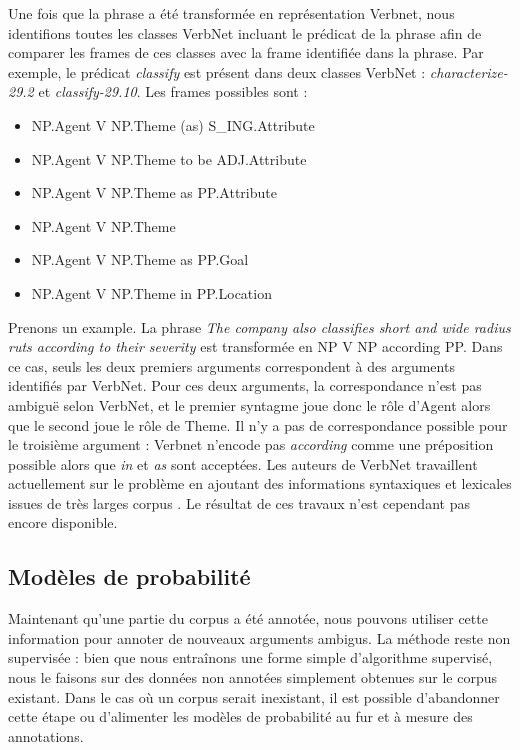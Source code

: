 Une fois que la phrase a été transformée en représentation Verbnet, nous
identifions toutes les classes VerbNet incluant le prédicat de la phrase afin
de comparer les frames de ces classes avec la frame identifiée dans la phrase.
Par exemple, le prédicat \textit{classify} est présent dans deux classes
VerbNet : \textit{characterize-29.2} et \textit{classify-29.10}. Les frames
possibles sont :

\begin{itemize}
    \item NP.Agent V NP.Theme (as) S\_ING.Attribute
    \item NP.Agent V NP.Theme to be ADJ.Attribute
    \item NP.Agent V NP.Theme as PP.Attribute
    \item NP.Agent V NP.Theme
    \item NP.Agent V NP.Theme as PP.Goal
    \item NP.Agent V NP.Theme in PP.Location
\end{itemize}

Prenons un example. La phrase \emph{The company also classifies short and wide
radius ruts according to their severity} est transformée en NP V NP according
PP. Dans ce cas, seuls les deux premiers arguments correspondent à des
arguments identifiés par VerbNet. Pour ces deux arguments, la correspondance
n'est pas ambiguë selon VerbNet, et le premier syntagme joue donc le rôle
d'Agent alors que le second joue le rôle de Theme. Il n'y a pas de
correspondance possible pour le troisième argument : Verbnet n'encode pas
\emph{according} comme une préposition possible alors que \emph{in} et
\emph{as} sont acceptées. Les auteurs de VerbNet travaillent actuellement sur
le problème en ajoutant des informations syntaxiques et lexicales issues de
très larges corpus \citep{bonial2013expanding}. Le résultat de ces travaux
n'est cependant pas encore disponible.


\subsection{Modèles de probabilité}

Maintenant qu'une partie du corpus a été annotée, nous pouvons utiliser cette
information pour annoter de nouveaux arguments ambigus. La méthode reste non
supervisée : bien que nous entraînons une forme simple d'algorithme supervisé,
nous le faisons sur des données non annotées simplement obtenues sur le corpus
existant. Dans le cas où un corpus serait inexistant, il est possible
d'abandonner cette étape ou d'alimenter les modèles de probabilité au fur et à
mesure des annotations.

